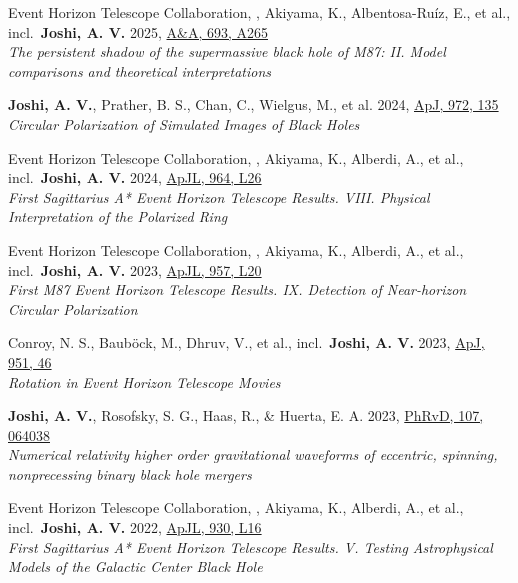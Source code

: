 \item Event Horizon Telescope Collaboration, , Akiyama, K., Albentosa-Ruíz, E., et al., incl.\ \textbf{Joshi, A. V.} 2025, \href{https://ui.adsabs.harvard.edu/abs/2025A\&A...693A.265E}{A\&A, 693, A265}\\\textit{The persistent shadow of the supermassive black hole of M87: II. Model comparisons and theoretical interpretations}

\item \textbf{Joshi, A. V.}, Prather, B. S., Chan, C., Wielgus, M., et al. 2024, \href{https://ui.adsabs.harvard.edu/abs/2024ApJ...972..135J}{ApJ, 972, 135}\\\textit{Circular Polarization of Simulated Images of Black Holes}

\item Event Horizon Telescope Collaboration, , Akiyama, K., Alberdi, A., et al., incl.\ \textbf{Joshi, A. V.} 2024, \href{https://ui.adsabs.harvard.edu/abs/2024ApJ...964L..26E}{ApJL, 964, L26}\\\textit{First Sagittarius A* Event Horizon Telescope Results. VIII. Physical Interpretation of the Polarized Ring}

\item Event Horizon Telescope Collaboration, , Akiyama, K., Alberdi, A., et al., incl.\ \textbf{Joshi, A. V.} 2023, \href{https://ui.adsabs.harvard.edu/abs/2023ApJ...957L..20E}{ApJL, 957, L20}\\\textit{First M87 Event Horizon Telescope Results. IX. Detection of Near-horizon Circular Polarization}

\item Conroy, N. S., Bauböck, M., Dhruv, V., et al., incl.\ \textbf{Joshi, A. V.} 2023, \href{https://ui.adsabs.harvard.edu/abs/2023ApJ...951...46C}{ApJ, 951, 46}\\\textit{Rotation in Event Horizon Telescope Movies}

\item \textbf{Joshi, A. V.}, Rosofsky, S. G., Haas, R., \& Huerta, E. A. 2023, \href{https://ui.adsabs.harvard.edu/abs/2023PhRvD.107f4038J}{PhRvD, 107, 064038}\\\textit{Numerical relativity higher order gravitational waveforms of eccentric, spinning, nonprecessing binary black hole mergers}

\item Event Horizon Telescope Collaboration, , Akiyama, K., Alberdi, A., et al., incl.\ \textbf{Joshi, A. V.} 2022, \href{https://ui.adsabs.harvard.edu/abs/2022ApJ...930L..16E}{ApJL, 930, L16}\\\textit{First Sagittarius A* Event Horizon Telescope Results. V. Testing Astrophysical Models of the Galactic Center Black Hole}

